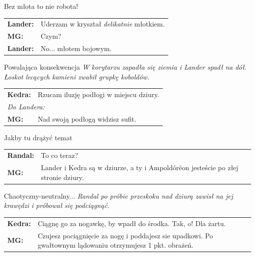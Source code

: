 \documentclass[10pt,twoside,twocolumn]{book}
\begin{document}
\begin{rpg-quotebox}{Bez młota to nie robota!}
   \begin{tabularx}{\columnwidth}{lX}
      \textbf{Lander:} & Uderzam w kryształ \emph{delikatnie} młotkiem.\\
      \textbf{MG:} &  Czym?\\
      \textbf{Lander:} & No... młotem bojowym.\\
   \end{tabularx}
\end{rpg-quotebox}

\begin{rpg-quotebox}{Powalająca konsekwencja}
   \textit{W korytarzu zapadła się ziemia i Lander spadł na dół. Łoskot lecących kamieni zwabił grupkę koboldów.}\\

   \begin{tabularx}{\columnwidth}{lX}
      \textbf{Kedra:} & Rzucam iluzję podłogi w miejscu dziury.\\
      \multicolumn{2}{l}{\textit{Do Landera:}}\\
      \textbf{MG:} & Nad swoją podłogą widzisz sufit.\\
   \end{tabularx}
\end{rpg-quotebox}

\begin{rpg-quotebox}{Jakby tu drążyć temat}
   \begin{tabularx}{\columnwidth}{lX}
      \textbf{Randal:} & To co teraz?\\
      \textbf{MG:} & Lander i Kedra są w dziurze, a ty i Ampoldórëon jesteście po złej stronie dziury.\\
   \end{tabularx}
\end{rpg-quotebox}

\begin{rpg-quotebox}{Chaotyczny-neutralny...}
   \textit{Randal po próbie przeskoku nad dziurą zawisł na jej krawędzi i próbował się podciągnąć.}\\

   \begin{tabularx}{\columnwidth}{lX}
      \textbf{Kedra:} &  Ciągnę go za nogawkę, by wpadł do środka. Tak, o! Dla żartu.\\
      \textbf{MG:} &  Czujesz pociągnięcie za nogę i poddajesz sie upadkowi. Po gwałtownym lądowaniu otrzymujesz 1 pkt. obrażeń.\\
   \end{tabularx}
\end{rpg-quotebox}
\end{document}
